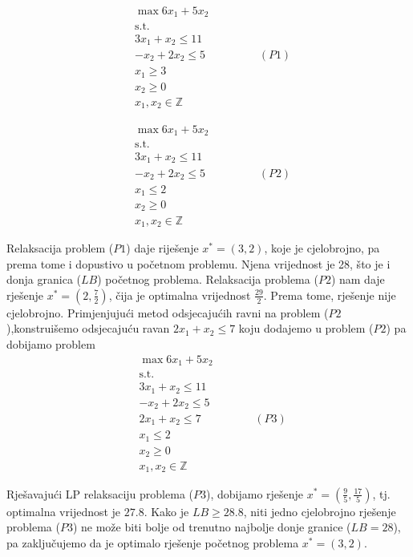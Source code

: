 \documentclass[a4paper, utf8, 11pt, colorlinks]{article}
\begin{document}
\begin{align*}
    &\max 6 x_1 + 5 x_2 \\
    & \mbox{s.t. } \\
    & 3x_1 + x_2 \leq 11 \\
    & - x_2 + 2 x_2 \leq 5 \hspace{2cm} (P1) \\
    & x_1 \geq 3 \\
    & x_2 \geq 0 \\
    & x_1, x_2 \in \mathbb{Z}
\end{align*}

\begin{align*}
    &\max 6 x_1 + 5 x_2 \\
    & \mbox{s.t. } \\
    & 3x_1 + x_2 \leq 11 \\
    & - x_2 + 2 x_2 \leq 5 \hspace{2cm} (P2) \\
    & x_1  \leq 2 \\
    & x_2 \geq 0 \\
    & x_1, x_2 \in \mathbb{Z}
\end{align*}

Relaksacija problem ($P1$) daje riješenje $x^*=(3,2)$, koje je cjelobrojno, pa prema tome i dopustivo u početnom problemu. Njena vrijednost je 28, što je i donja granica ($LB$) početnog problema. Relaksacija problema ($P2$) nam daje rješenje $x^*=(2, \frac{7}{2})$, čija je optimalna vrijednost $\frac{29}{2}$.  Prema tome, rješenje nije cjelobrojno. Primjenjujući metod odsjecajućih ravni na problem ($P2$),konstruišemo odsjecajuću ravan $2x_1 + x_2 \leq 7$ koju dodajemo u problem ($P2$) pa dobijamo problem 
\begin{align*}
     &\max 6 x_1 + 5 x_2 \\
    & \mbox{s.t. } \\
    & 3x_1 + x_2 \leq 11 \\
    & - x_2 + 2 x_2 \leq 5  \\
    & 2x_1 + x_2 \leq 7 \hspace{2cm} (P3)\\ 
    & x_1  \leq 2 \\
    & x_2 \geq 0 \\
    & x_1, x_2 \in \mathbb{Z}
\end{align*}

Rješavajući LP relaksaciju problema ($P3$), dobijamo rješenje $x^*=(\frac{9}{5}, \frac{17}{5})$, tj.  optimalna vrijednost je $27.8$. Kako je $LB \geq 28.8$, niti jedno cjelobrojno rješenje problema ($P3$) ne može biti bolje od trenutno najbolje donje granice ($LB=28$), pa zaključujemo da je optimalo rješenje početnog problema $x^*=(3,2)$. 
\end{document}
